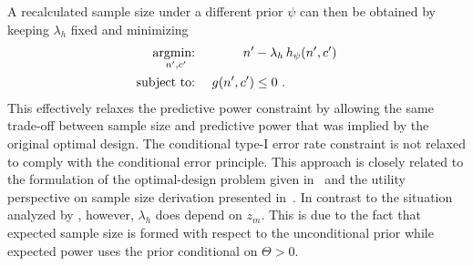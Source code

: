 \documentclass[12pt]{article}
\newcommand{\st}{\operatorname{subject\ to:\ }}
\newcommand{\argmin}[1]{\operatornamewithlimits{argmin:\ }_{#1}}
\begin{document}
A recalculated sample size under a different prior $\psi$ can then be obtained by
keeping $\lambda_h$ fixed and minimizing
\begin{align}
    \argmin{n',c'} && n'&-\lambda_h\, h_\psi(n',c') \\
     \st && g(n', c') &\leq 0 \ .
\end{align}
This effectively relaxes the predictive power constraint by allowing the same trade-off
between sample size and predictive power that was implied by the original optimal design.
The conditional type-I error rate constraint is not relaxed to comply with the
conditional error principle.
This approach is closely related to the formulation of the optimal-design problem given in~\cite{jennison2015} and the utility perspective on sample
size derivation presented in~\cite{kunzmann2020}.
In contrast to the situation analyzed by \cite{jennison2015}, however,
$\lambda_h$ does depend on $z_m$.
This is due to the fact that expected sample size is formed with respect to the unconditional
prior while expected power uses the prior conditional on $\Theta>0$.
\end{document}
